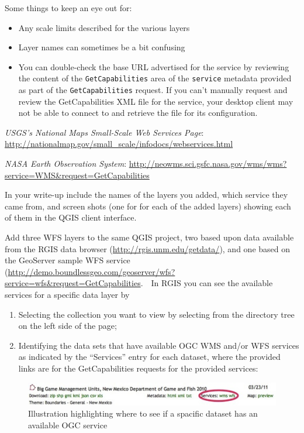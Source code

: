 \documentclass[]{book}
\providecommand{\tightlist}{%
  \setlength{\itemsep}{0pt}\setlength{\parskip}{0pt}}
\begin{document}
Some things to keep an eye out for:

\begin{itemize}
\tightlist
\item
  Any scale limits described for the various layers
\item
  Layer names can sometimes be a bit confusing
\item
  You can double-check the base URL advertised for the service by
  reviewing the content of the \texttt{GetCapabilities} area of the
  \texttt{service} metadata provided as part of the
  \texttt{GetCapabilities} request. If you can't manually request and
  review the GetCapabilities XML file for the service, your desktop
  client may not be able to connect to and retrieve the file for its
  configuration.
\end{itemize}

\emph{USGS's National Maps \emph{Small-Scale Web Services} Page}:
\url{http://nationalmap.gov/small_scale/infodocs/webservices.html}

\emph{NASA Earth Observation System}:
\url{http://neowms.sci.gsfc.nasa.gov/wms/wms?service=WMS\&request=GetCapabilities}

In your write-up include the names of the layers you added, which
service they came from, and screen shots (one for for each of the added
layers) showing each of them in the QGIS client interface.

Add three WFS layers to the same QGIS project, two based upon data
available from the RGIS data browser
(\url{http://rgis.unm.edu/getdata/}), and one based on the GeoServer
sample WFS service
(\url{http://demo.boundlessgeo.com/geoserver/wfs?service=wfs\&request=GetCapabilities}.
  In RGIS you can see the available services for a specific data layer
by

\begin{enumerate}
\def\labelenumi{\arabic{enumi}.}
\item
  Selecting the collection you want to view by selecting from the
  directory tree on the left side of the page;
\item
  Identifying the data sets that have available OGC WMS and/or WFS
  services as indicated by the ``Services'' entry for each dataset,
  where the provided links are for the GetCapabilities requests for the
  provided services:
\end{enumerate}

\begin{figure}[htbp]
\centering
\includegraphics{images/RGIS_OGCLinkScreenshot.jpg}
\caption{Illustration highlighting where to see if a spacific dataset
has an available OGC service}
\end{figure}
\end{document}
